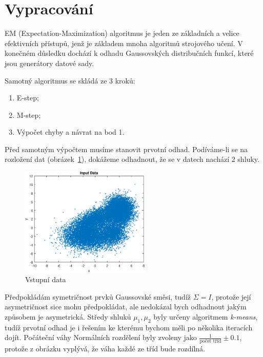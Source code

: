 \section{Vypracování}

EM (Expectation-Maximization) algoritmus je jeden ze základních a velice efektivních přístupů, jenž je základem mnoha algoritmů strojového učení.
V konečném důsledku dochází k odhadu Gaussovských distribučních funkcí, které jsou generátory datové sady.

Samotný algoritmus se skládá ze 3 kroků:

\begin{enumerate}
    \item E-step;
    \item M-step;
    \item Výpočet chyby a návrat na bod 1.
\end{enumerate}

Před samotným výpočtem musíme stanovit prvotní odhad.
Podíváme-li se na rozložení dat (obrázek~\ref{fig:result1}), dokážeme odhadnout, že se v datech nachází 2 shluky.

\begin{figure}[htb]
    \centering
    \includegraphics[width=0.55\textwidth]{graphs/fig1.eps}
    \caption{Vstupní data}
    \label{fig:result1}
\end{figure}
\FloatBarrier

Předpokládám symetričnost prvků Gaussovské směsi, tudíž \( \Sigma = I \), protože její asymetričnost sice mohu předpokládat, ale nedokázal bych odhadnout jakým způsobem je asymetrická.
Středy shluků \( \mu_1, \mu_2 \) byly určeny algoritmem \textit{k-means}, tudíž prvotní odhad je i řešením ke kterému bychom měli po několika iteracích dojít.
Počáteční váhy Normálních rozdělení byly zvoleny jako \( \frac{1}{\text{počet tříd}} \pm 0.1 \), protože z obrázku vyplývá, že váha každé ze tříd bude rozdílná.

